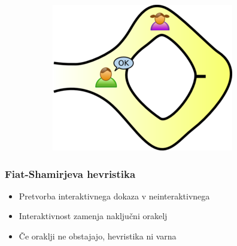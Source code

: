\documentclass{beamer}    %
\begin{document}
\begin{frame}
\begin{figure}
\begin{subfigure}{0.3\textwidth}
        \end{subfigure}
        \hspace{0.25cm}
        \begin{subfigure}{0.3\textwidth}
            \includegraphics[width=\textwidth]{images/zkp3.png}
        \end{subfigure}
    \end{figure}
\end{frame}

\begin{frame}
    \frametitle{Fiat-Shamirjeva hevristika}
    \begin{itemize}
        \item Pretvorba interaktivnega dokaza v neinteraktivnega
        \item Interaktivnost zamenja naključni orakelj
        \item Če oraklji ne obstajajo, hevristika ni varna
    \end{itemize}
\end{frame}
\end{document}

